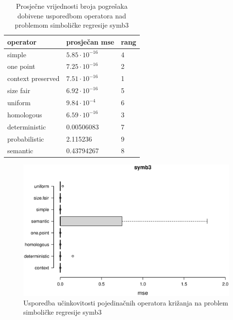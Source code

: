 \begin{table}[H]
 	\centering

    \caption{Prosječne vrijednosti broja pogrešaka dobivene usporedbom operatora nad problemom simboličke regresije symb3}
    \begin{tabular}{| l | l | l |}
    \hline
    \textbf{operator} & \textbf{prosječan mse} & \textbf{rang}\\ \hline
    simple & $5.85 \cdot 10^{-16}$ & 4\\ \hline
    one point & $7.25 \cdot 10^{-16}$ & 2\\ \hline
    context preserved & $7.51 \cdot 10^{-16}$ & 1 \\ \hline
    size fair & $6.92 \cdot 10^{-16}$ & 5\\ \hline
    uniform & $9.84 \cdot 10^{-4}$ & 6\\ \hline
    homologous & $6.59 \cdot 10^{-16}$ & 3\\ \hline
    deterministic & 0.00506083 & 7\\ \hline
    probabilistic & 2.115236 & 9\\ \hline
    semantic & 0.43794267 & 8\\ \hline
    \end{tabular}
    
    \label{symb3table}
\end{table}

\begin{figure}[H]
	\centering
	\includegraphics[trim=0cm 4cm 0cm 0cm, scale=0.6]{./slike/boxPlots/symb3.eps}
	\caption{Usporedba učinkovitosti pojedinačnih operatora križanja na problem simboličke regresije symb3}
	\label{symb3box}
\end{figure}

